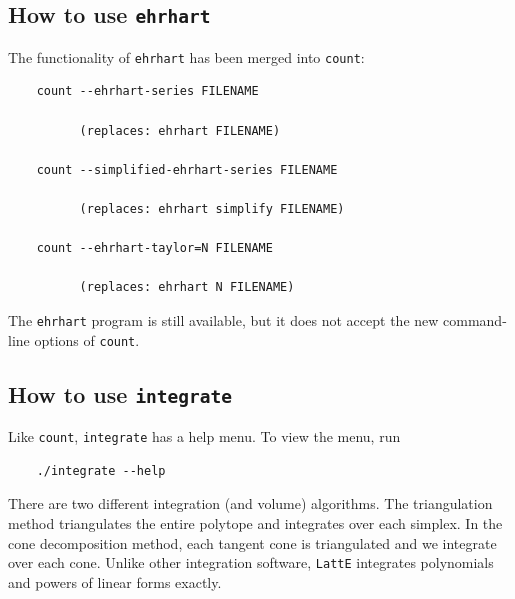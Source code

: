 \documentclass{article}
\newcommand{\latte}{{\tt LattE}\xspace}
\begin{document}
\subsection{How to use {\tt ehrhart}}

The functionality of {\tt ehrhart} has been merged into {\tt count}:

\begin{verbatim} 
	count --ehrhart-series FILENAME
	
	      (replaces: ehrhart FILENAME)

	count --simplified-ehrhart-series FILENAME

	      (replaces: ehrhart simplify FILENAME)

	count --ehrhart-taylor=N FILENAME

	      (replaces: ehrhart N FILENAME)
\end{verbatim}

The {\tt ehrhart} program is still available, but it does not accept
   the new command-line options of {\tt count}.

\subsection{How to use {\tt integrate}}

Like {\tt count}, {\tt integrate} has a help menu. To view the menu, run

\begin{verbatim}
	./integrate --help
\end{verbatim}	

There are two different integration (and volume) algorithms. The triangulation method triangulates the entire polytope and integrates over each simplex. In the cone decomposition method, each tangent cone is triangulated and we integrate over each cone. Unlike other integration software, \latte integrates polynomials and powers of linear forms exactly.
\end{document}
